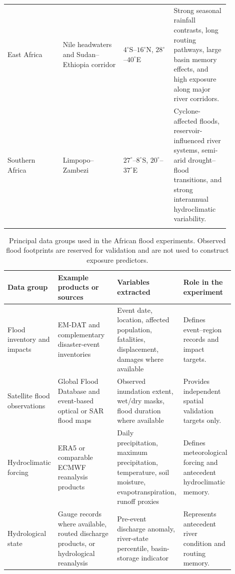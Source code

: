 \documentclass[pdflatex,sn-mathphys-ay]{sn-jnl}
\theoremstyle{thmstyleone}
\begin{document}
\begin{appendices}
\begin{table}[p]
\begin{tabular}{p{0.22\linewidth}p{0.24\linewidth}
                p{0.20\linewidth}p{0.22\linewidth}}
East Africa
&
Nile headwaters and Sudan--Ethiopia corridor
&
$4^{\circ}$S--$16^{\circ}$N,
$28^{\circ}$--$40^{\circ}$E
&
Strong seasonal rainfall contrasts, long routing pathways,
large basin memory effects, and high exposure along major river
corridors. \\

Southern Africa
&
Limpopo--Zambezi
&
$27^{\circ}$--$8^{\circ}$S,
$20^{\circ}$--$37^{\circ}$E
&
Cyclone-affected floods, reservoir-influenced river systems,
semi-arid drought--flood transitions, and strong interannual
hydroclimatic variability. \\
\botrule
\end{tabular}
\end{table}

\begin{table}[p]
\centering
\small
\caption{
Principal data groups used in the African flood experiments.
Observed flood footprints are reserved for validation and are not used
to construct exposure predictors.
}
\label{tab:app_data_sources}
\begin{tabular}{p{0.19\linewidth}p{0.27\linewidth}
                p{0.24\linewidth}p{0.20\linewidth}}
\toprule
Data group & Example products or sources & Variables extracted
& Role in the experiment \\
\midrule
Flood inventory and impacts
&
EM-DAT and complementary disaster-event inventories
\citep{EMDAT2024}
&
Event date, location, affected population, fatalities,
displacement, damages where available
&
Defines event--region records and impact targets. \\

Satellite flood observations
&
Global Flood Database and event-based optical or SAR flood maps
\citep{Tellman2021}
&
Observed inundation extent, wet/dry masks, flood duration where
available
&
Provides independent spatial validation targets only. \\

Hydroclimatic forcing
&
ERA5 or comparable ECMWF reanalysis products
\citep{Dee2011,Hersbach2020}
&
Daily precipitation, maximum precipitation, temperature,
soil moisture, evapotranspiration, runoff proxies
&
Defines meteorological forcing and antecedent hydroclimatic
memory. \\

Hydrological state
&
Gauge records where available, routed discharge products,
or hydrological reanalysis
\citep{VanDerKnijff2010,Alfieri2013,Thiemig2015}
&
Pre-event discharge anomaly, river-state percentile,
basin-storage indicator
&
Represents antecedent river condition and routing memory. \\


\end{tabular}
\end{table}
\end{appendices}
\end{document}
